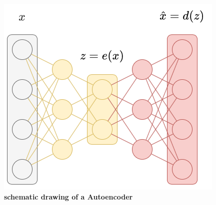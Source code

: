 \begin{figure}[t]
    \includegraphics[width=0.5\linewidth]{figures/background/AE.png}
    \caption[Autoencoder schematics]{\textbf{schematic drawing of a Autoencoder}}
    \label{fig:Autoencoder_schematics}
\end{figure}